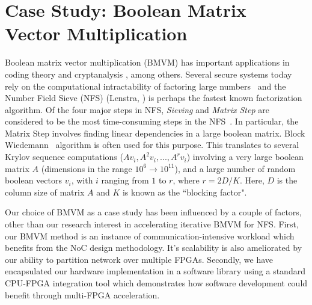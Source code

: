 \documentclass[conference, 9pt]{IEEEtran}
\begin{document}
\section{Case Study: Boolean Matrix Vector Multiplication}\label{sec:BMVM}
Boolean matrix vector multiplication (BMVM) has important applications in coding theory 
and cryptanalysis
, among others. Several secure systems today rely on the computational intractability of factoring large
numbers~\cite{wiener1990cryptanalysis} and the Number Field Sieve (NFS) (Lenstra, \cite{lenstra1990number}) is perhaps the fastest known factorization algorithm.
Of the four major steps in NFS, \emph{Sieving} and \emph{Matrix Step} are considered to be the most time-consuming steps in the
NFS~\cite{anand2007factoring}. In particular, the Matrix Step involves finding linear dependencies
in a large boolean matrix. Block Wiedemann~\cite{coppersmith1994solving} algorithm is often used for
this purpose.  This translates to several Krylov sequence computations ($Av_{i}, A^{2}v_{i}, ... , A^{r}v_{i}$) involving a very large boolean matrix $A$ (dimensions in the range $10^6\to10^{11}$), and 
a large number of random boolean vectors $v_{i}$, with $i$ ranging from $1$ to $r$, where $r = 2D/K$. Here, $D$ is the column size of matrix $A$ and $K$ is known as the ``blocking
factor".

Our choice of BMVM as a case study has been influenced by a couple of factors, other than our research interest in accelerating iterative BMVM for NFS. First, our BMVM method is an instance of communication-intensive workload which benefits from the NoC design methodology. It's scalability is also ameliorated by our ability to partition network over multiple FPGAs. Secondly, we have encapsulated our hardware implementation in a software library using a standard CPU-FPGA integration tool which demonstrates how software development could benefit through multi-FPGA acceleration.
\end{document}
